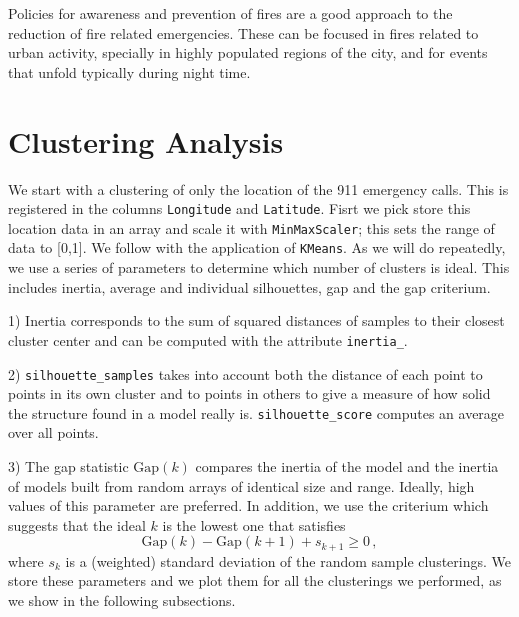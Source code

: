 \documentclass[12pt,a4paper]{article}
\begin{document}
Policies for awareness and prevention of fires are a good approach to the reduction of fire related emergencies. These can be focused in fires related to urban activity, specially in highly populated regions of the city, and for events that unfold typically during night time.


%



\appendix

\section{Clustering Analysis} \label{ClAn}

We start with a clustering of only the location of the 911 emergency calls. This is registered in the columns \verb|Longitude| and \verb|Latitude|. Fisrt we pick store this location data in an array and scale it with \verb|MinMaxScaler|; this sets the range of data to [0,1]. We follow with the application of \verb|KMeans|. As we will do repeatedly, we use a series of parameters to determine which number of clusters is ideal. This includes inertia, average and individual silhouettes, gap and the gap criterium.

1) Inertia corresponds to the sum of squared distances of samples to their closest cluster center and can be computed with the attribute \verb|inertia_|.

2) \verb|silhouette_samples| takes into account both the distance of each point to points in its own cluster and to points in others to give a measure of how solid the structure found in a model really is. \verb|silhouette_score| computes an average over all points.

3) The gap statistic $\mathrm{Gap}(k)$ compares the inertia of the model and the inertia of models built from random arrays of identical size and range. Ideally, high values of this parameter are preferred. In addition, we use the criterium which suggests that the ideal $k$ is the lowest one that satisfies \cite{Tibshirani}
\begin{equation}\label{eq_gap_crit}
\mathrm{Gap}(k) - \mathrm{Gap}(k+1) + s_{k+1} \geq 0 \, ,
\end{equation}
where $s_k$ is a (weighted) standard deviation of the random sample clusterings. We store these parameters and we plot them for all the clusterings we performed, as we show in the following subsections.
\end{document}
